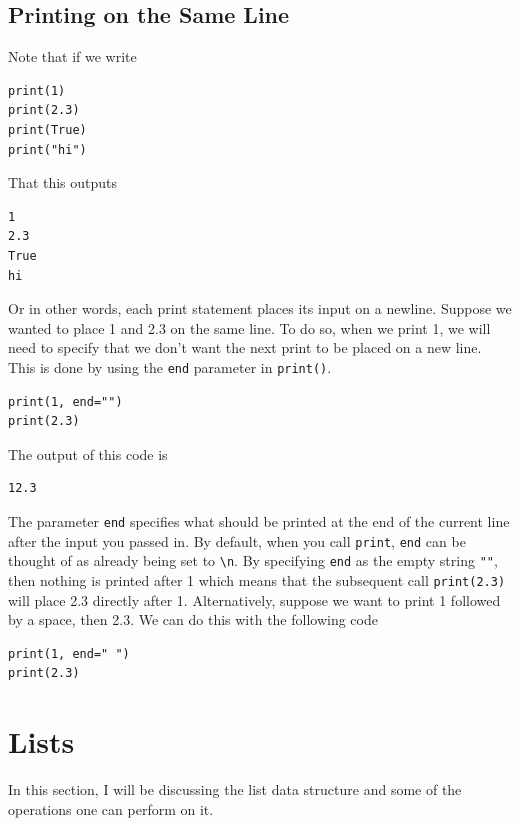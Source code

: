 \documentclass{article}
\begin{document}
\subsection{Printing on the Same Line}
Note that if we write
\begin{verbatim}
print(1)
print(2.3)
print(True)
print("hi")
\end{verbatim}
That this outputs
\begin{verbatim}
1
2.3
True
hi
\end{verbatim}
Or in other words, each print statement places its input on a newline. Suppose we wanted to place 1 and 2.3 on the same line. To do so, when we print 1, we will need to specify that we don't want the next print to be placed on a new line. This is done by using the \texttt{end} parameter in \texttt{print()}.
\begin{verbatim}
print(1, end="")
print(2.3)
\end{verbatim}
The output of this code is
\begin{verbatim}
12.3
\end{verbatim}
The parameter \texttt{end} specifies what should be printed at the end of the current line after the input you passed in. By default, when you call \texttt{print}, \texttt{end} can be thought of as already being set to \texttt{\textbackslash n}. By specifying \texttt{end} as the empty string \texttt{""}, then nothing is printed after 1 which means that the subsequent call \texttt{print(2.3)} will place 2.3 directly after 1. Alternatively, suppose we want to print 1 followed by a space, then 2.3. We can do this with the following code
\begin{verbatim}
print(1, end=" ")
print(2.3)
\end{verbatim}

\newpage

\section{Lists}
In this section, I will be discussing the list data structure and some of the operations one can perform on it.
\end{document}
